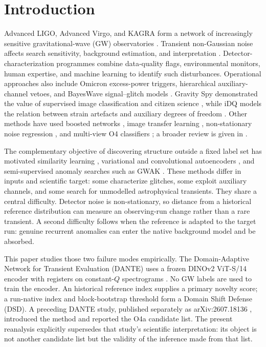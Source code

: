 \documentclass[aps,prd,twocolumn,superscriptaddress,nofootinbib,amsmath,amssymb,floatfix,10pt]{revtex4-2}
\begin{document}
\maketitle

\section{Introduction}
\label{sec:introduction}

Advanced LIGO, Advanced Virgo, and KAGRA form a network of increasingly
sensitive gravitational-wave (GW) observatories
\cite{LIGOScientific:2014pky,Acernese_2014,KAGRA:2020tym}.  Transient
non-Gaussian noise affects search sensitivity, background estimation, and
interpretation \cite{nuttall2018,davis2021,soni2025,pankow2018}.
Detector-characterization programmes
combine data-quality flags, environmental monitors, human expertise, and
machine learning to identify such disturbances.  Operational approaches also
include Omicron excess-power triggers, hierarchical auxiliary-channel vetoes,
and BayesWave signal--glitch models \cite{robinet2020,smith2011,cornish2015}.
Gravity Spy demonstrated the
value of supervised image classification and citizen science
\cite{biswas2013,powell2015,zevin2017,bahaadini2018,glanzer2023}, while iDQ models the relation between
strain artefacts and auxiliary degrees of freedom \cite{essick2020}.  Other
methods have used boosted networks \cite{mukund2017}, image transfer learning
\cite{razzano2018,george2018}, non-stationary noise regression
\cite{vajente2020,ormiston2020}, and multi-view O4 classifiers \cite{wu2024};
a broader review is given in \cite{cuoco2021}.

The complementary objective of discovering structure outside a fixed label set
has motivated similarity learning \cite{coughlin2019}, variational and
convolutional autoencoders \cite{sakai2022,laguarta2023}, and semi-supervised
anomaly searches such as GWAK \cite{raikman2023}.  These methods differ in
inputs and scientific target: some characterize glitches, some exploit
auxiliary channels, and some search for unmodelled astrophysical transients.
They share a central difficulty.  Detector noise is non-stationary, so distance
from a historical reference distribution can measure an observing-run change
rather than a rare transient.  A second difficulty follows when the reference
is adapted to the target run: genuine recurrent anomalies can enter the native
background model and be absorbed.

This paper studies those two failure modes empirically.  The Domain-Adaptive
Network for Transient Evaluation (DANTE) uses a frozen
DINOv2 ViT-S/14 encoder with registers \cite{oquab2024,darcet2024} on
constant-$Q$ spectrograms \cite{chatterji2004}.  No GW labels are used to train
the encoder.  An historical reference index supplies a primary novelty score;
a run-native index and block-bootstrap threshold form a Domain Shift Defense
(DSD).  A preceding DANTE study, published separately as
arXiv:2607.18136 \cite{dante_prior}, introduced the method and reported the O4a
candidate list.  The present reanalysis explicitly supersedes that study's
scientific interpretation: its object is not another candidate list but the
validity of the inference made from that list.
\end{document}
